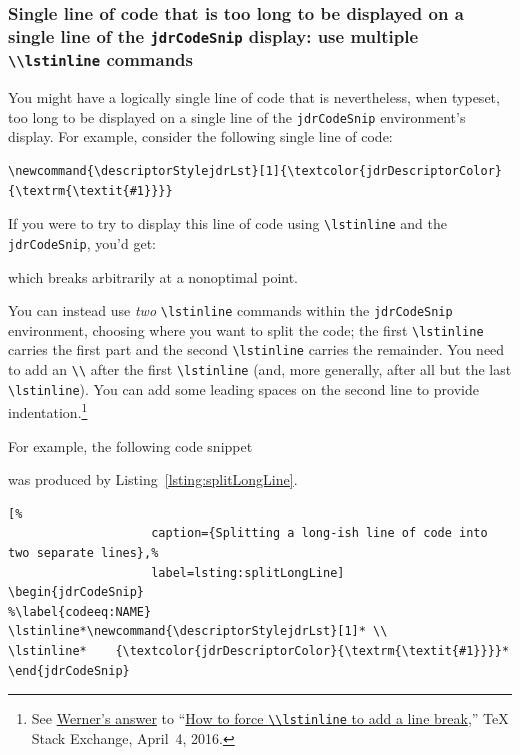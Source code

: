 \documentclass[12pt,table,final]{article}%
\begin{document}
\subsubsection{Single line of code that is too long to be displayed on a single line of the \lstinline|jdrCodeSnip| display: use multiple \lstinline|\\lstinline| commands}
\label{section:singleLineTooLongForJdrCodeSnip}
You might have a logically single line of code that is nevertheless, when typeset, too long to be displayed on a single line of the \lstinline|jdrCodeSnip| environment's display. For example, consider the following single line of code:
\begin{lstlisting}
\newcommand{\descriptorStylejdrLst}[1]{\textcolor{jdrDescriptorColor}{\textrm{\textit{#1}}}}
\end{lstlisting}

If you were to try to display this line of code using \lstinline|\lstinline| and the \lstinline|jdrCodeSnip|, you'd get:
which breaks arbitrarily at a nonoptimal point.

You can instead use \emph{two} \lstinline|\lstinline| commands within the \lstinline|jdrCodeSnip| environment, choosing where you want to split the code; the first \lstinline|\lstinline| carries the first part and the second \lstinline|\lstinline| carries the remainder. You need to add an \lstinline|\\| after the first \lstinline|\lstinline| (and, more generally, after all but the last \lstinline|\lstinline|). You can add some leading spaces on the second line to provide indentation.\footnote{See \href{https://tex.stackexchange.com/a/302521/7922}{Werner's answer} to ``\href{enterUrl}{How to force \lstinline|\\lstinline| to add a line break},'' \TeX{} Stack Exchange, April~4, 2016.}

For example, the following code snippet
was produced by Listing~\ref{lsting:splitLongLine}.
\begin{lstlisting}[%
                    caption={Splitting a long-ish line of code into two separate lines},%
                    label=lsting:splitLongLine]
\begin{jdrCodeSnip}
%\label{codeeq:NAME}
\lstinline*\newcommand{\descriptorStylejdrLst}[1]* \\
\lstinline*    {\textcolor{jdrDescriptorColor}{\textrm{\textit{#1}}}}*
\end{jdrCodeSnip}
\end{lstlisting}
\end{document}
